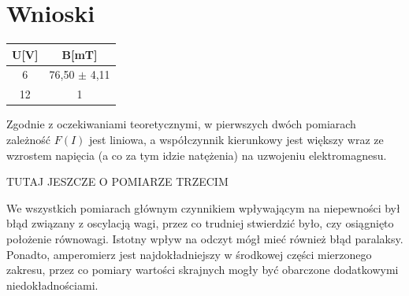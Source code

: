 \documentclass{article}
\begin{document}
\section{Wnioski}

\begin{center}
\begin{tabular}{c | c}
U[V] & B[mT] \\
\hline
6 & 76,50 $\pm$ 4,11 \\
12 & 1
\end{tabular}
\end{center}
Zgodnie z oczekiwaniami teoretycznymi,  w pierwszych dwóch pomiarach zależność $F(I)$ jest liniowa, 
a współczynnik kierunkowy jest większy wraz ze wzrostem napięcia (a co za tym idzie natężenia) na uzwojeniu elektromagnesu.

TUTAJ JESZCZE O POMIARZE TRZECIM

We wszystkich pomiarach głównym czynnikiem wpływającym na niepewności był błąd związany z oscylacją wagi, przez co trudniej stwierdzić było, czy osiągnięto położenie równowagi.
Istotny wpływ na odczyt mógł mieć również błąd paralaksy. Ponadto, amperomierz jest najdokładniejszy w środkowej części mierzonego zakresu, przez co pomiary 
wartości skrajnych mogły być obarczone dodatkowymi niedokładnościami.
\end{document}

